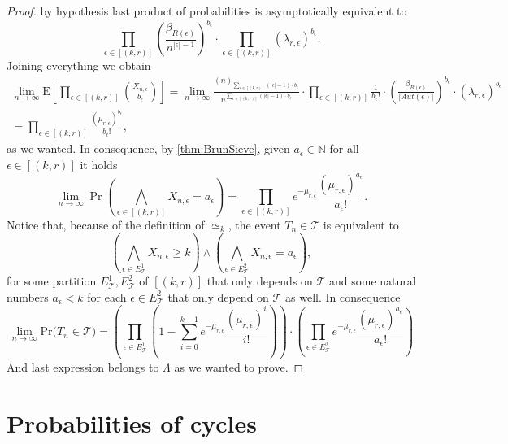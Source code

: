 \documentclass[12pt,notitlepage,a4paper]{article}
\theoremstyle{definition}
\newcommand{\N}{\mathbb{N}}
\newcommand{\Ln}{\lim\limits_{n\to \infty}}
\newcommand{\PR}[1]{\mathrm{Pr}\big(#1\big)}
\begin{document}
\begin{proof}
	by hypothesis last product of probabilities is asymptotically equivalent
	to
	\[
	\prod_{\epsilon\in [(k,r)]}
	\left(\frac{\beta_{R(\epsilon)}}
	{n^{|\epsilon|-1}}\right)^{b_\epsilon} \cdot
	\prod_{\epsilon\in [(k,r)]} (\lambda_{r,\epsilon})^{b_\epsilon}.
	\]
	Joining everything we obtain 
	\begin{align*} 
	\Ln
	\mathrm{E}
	\left[
	\prod_{\epsilon\in [(k,r)]} \binom{X_{n,\epsilon}}{b_\epsilon}	
	\right]
	= \Ln  
	\frac{(n)_{\sum_{\epsilon\in [(k,r)]}(|\epsilon|-1)\cdot b_\epsilon}}
	{n^{\sum_{\epsilon\in [(k,r)]}(|\epsilon|-1)\cdot b_\epsilon}}
	\cdot
	\prod_{\epsilon\in [(k,r)]}
	\frac{1}{b_\epsilon!} \cdot
	\left( \frac{\beta_{R(\epsilon)}}{|Aut(\epsilon)|} \right)^
	{b_\epsilon} \cdot 
	(\lambda_{r,\epsilon})^{b_\epsilon}&\\
	= \prod_{\epsilon\in [(k,r)]}
	\frac{\left( \mu_{r,\epsilon} \right)^
	{b_\epsilon}}{b_\epsilon!}
	,&
	\end{align*}
	as we wanted. In consequence, by \cref{thm:BrunSieve},
	given $a_{\epsilon}\in \N$ for all $\epsilon\in [(k,r)]$
	it holds
	\[
	\Ln
	\Pr\left( 
	\bigwedge_{\epsilon \in [(k,r)]} X_{n,\epsilon}=a_\epsilon
	\right)=
	\prod_{\epsilon\in [(k,r)]} e^{-\mu_{r,\epsilon}}
	\frac{(\mu_{r,\epsilon})^{a_\epsilon}}{a_\epsilon!}.
	\]
	Notice that, because of the definition of $\simeq_k$, 
	the event $T_n\in \mathcal{T}$ is equivalent to 
	\[
	\left(\bigwedge_{\epsilon \in E^1_\mathcal{T}}
	X_{n,\epsilon}\geq k 
	\right) \wedge \left(\bigwedge_{\epsilon \in E^2_\mathcal{T}}
	X_{n,\epsilon}=a_\epsilon\right),
	\]
	for some partition $E^1_\mathcal{T}, E^2_\mathcal{T}$
	of $[(k,r)]$ that only depends on $\mathcal{T}$ and some
	natural numbers $a_\epsilon < k$ for each $\epsilon\in
	E^2_\mathcal{T}$ that only depend on $\mathcal{T}$ as well. 
	In consequence 
	\[
	\Ln \PR{T_n\in \mathcal{T}}= 
	\left(
	\prod_{\epsilon\in E^1_\mathcal{T}} \left( 1-\sum_{i=0}^{k-1}
	e^{-\mu_{r,\epsilon}}
	\frac{(\mu_{r,\epsilon})^i}{i!} \right)
	\right)\cdot
	\left(
	\prod_{\epsilon\in E^2_\mathcal{T}}
	e^{-\mu_{r,\epsilon}}
	\frac{(\mu_{r,\epsilon})^{a_{\epsilon}}}{a_\epsilon!} 
	\right)
	\]
	And last expression belongs to $\Lambda$ as we wanted to prove. 
 	\end{proof}

		
	\section{Probabilities of cycles}
\end{document}
